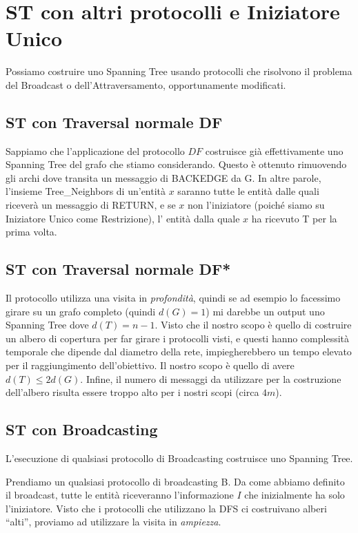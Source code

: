 \section{ST con altri protocolli e Iniziatore Unico}
Possiamo costruire uno Spanning Tree usando protocolli che risolvono il problema
del Broadcast o dell'Attraversamento, opportunamente modificati.

\subsection{ST con Traversal normale DF}
Sappiamo che l'applicazione del protocollo $DF$ costruisce già effettivamente
uno Spanning Tree del grafo che stiamo considerando. Questo è ottenuto
rimuovendo gli archi dove transita un messaggio di BACKEDGE da G. In altre
parole, l'insieme Tree\_Neighbors di un'entità $x$ saranno tutte le entità dalle
quali riceverà un messaggio di RETURN, e se $x$ non l'iniziatore (poiché siamo
su Iniziatore Unico come Restrizione), l' entità dalla quale $x$ ha ricevuto T
per la prima volta.

\subsection{ST con Traversal normale DF*}
Il protocollo utilizza una visita in \textit{profondità}, quindi se ad esempio
lo facessimo girare su un grafo completo (quindi $d(G)=1$) mi darebbe un output
uno Spanning Tree dove $d(T) = n-1$. Visto che il nostro scopo è quello di
costruire un albero di copertura per far girare i protocolli visti, e questi
hanno complessità temporale che dipende dal diametro della rete, impiegherebbero
un tempo elevato per il raggiungimento dell'obiettivo. Il nostro scopo è quello
di avere $d(T) \leq 2d(G)$. Infine, il numero di messaggi da utilizzare per la
costruzione dell'albero risulta essere troppo alto per i nostri scopi (circa
$4m$).

\subsection{ST con Broadcasting}

\begin{theorem}
    L'esecuzione di qualsiasi protocollo di Broadcasting costruisce uno Spanning
    Tree.
\end{theorem}

Prendiamo un qualsiasi protocollo di broadcasting B. Da come abbiamo definito il
broadcast, tutte le entità riceveranno l'informazione $I$ che inizialmente ha
solo l'iniziatore.
Visto che i protocolli che utilizzano la DFS ci costruivano alberi ``alti'',
proviamo ad utilizzare la visita in \textit{ampiezza}.

